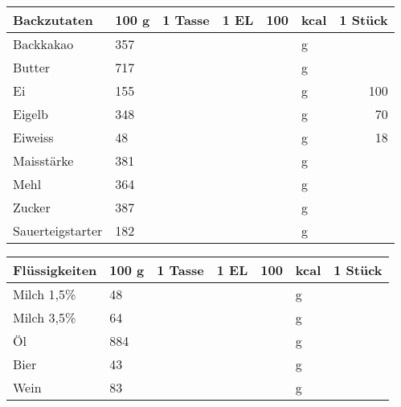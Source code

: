 \vfill

\begin{tabularx}{\linewidth}{X|l|r|r|rl|r}
Backzutaten       &   100 g & 1 Tasse & 1 EL &      100 & kcal    & 1 Stück  \\
\hline
Backkakao         &     357 &         &      &          & g       &          \\
Butter            &     717 &         &      &          & g       &          \\
Ei                &     155 &         &      &          & g       &     100  \\
Eigelb            &     348 &         &      &          & g       &      70  \\
Eiweiss           &      48 &         &      &          & g       &      18  \\
Maisstärke        &     381 &         &      &          & g       &          \\
Mehl              &     364 &         &      &          & g       &          \\
Zucker            &     387 &         &      &          & g       &          \\
Sauerteigstarter  &     182 &         &      &          & g       &          \\
\end{tabularx}

\vfill

\begin{tabularx}{\linewidth}{X|l|r|r|rl|r}
Flüssigkeiten     &   100 g & 1 Tasse & 1 EL &      100 & kcal    & 1 Stück  \\
\hline
Milch 1,5\%       &      48 &         &      &          & g       &          \\
Milch 3,5\%       &      64 &         &      &          & g       &          \\
Öl                &     884 &         &      &          & g       &          \\
Bier              &      43 &         &      &          & g       &          \\
Wein              &      83 &         &      &          & g       &          \\
\end{tabularx}
